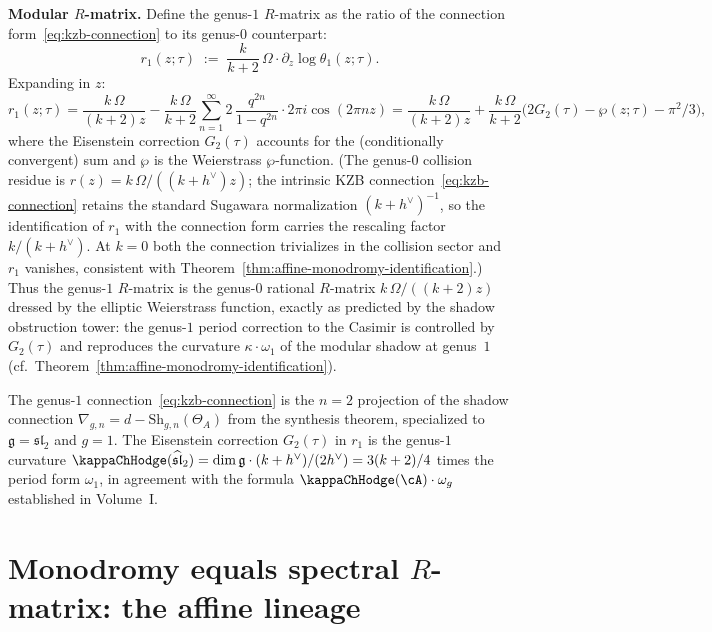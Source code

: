 \begin{computation}
\medskip\noindent\textbf{Modular $R$-matrix.}\;
Define the genus-$1$ $R$-matrix as the ratio of the connection
form~\eqref{eq:kzb-connection} to its genus-$0$ counterpart:
\begin{equation}\label{eq:genus1-r-matrix}
 r_1(z;\tau) \;:=\; \frac{k}{k+2}\,\Omega\cdot \partial_z\!\log\theta_1(z;\tau).
\end{equation}
Expanding in $z$:
\[
 r_1(z;\tau)
 = \frac{k\,\Omega}{(k+2)z}
 - \frac{k\,\Omega}{k+2}\sum_{n=1}^{\infty}2\,
 \frac{q^{2n}}{1-q^{2n}}\cdot 2\pi i\cos(2\pi nz)
 = \frac{k\,\Omega}{(k+2)z}
 + \frac{k\,\Omega}{k+2}\bigl(2G_2(\tau)-\wp(z;\tau)-\pi^2/3\bigr),
\]
where the Eisenstein correction $G_2(\tau)$ accounts for the
(conditionally convergent) sum and $\wp$ is the Weierstrass
$\wp$-function. (The genus-$0$ collision residue is $r(z) = k\,\Omega/((k+h^\vee)z)$; the intrinsic
KZB connection~\eqref{eq:kzb-connection} retains the standard
Sugawara normalization $(k+h^\vee)^{-1}$, so the identification of
$r_1$ with the connection form carries the rescaling factor
$k/(k+h^\vee)$. At $k=0$ both the connection trivializes in the
collision sector and $r_1$ vanishes, consistent with
Theorem~\ref{thm:affine-monodromy-identification}.) Thus the
genus-$1$ $R$-matrix is the genus-$0$
rational $R$-matrix $k\,\Omega/((k+2)z)$ dressed by the elliptic
Weierstrass function, exactly as predicted by the shadow obstruction tower:
the genus-$1$ period correction to the Casimir is controlled by
$G_2(\tau)$ and reproduces the curvature $\kappa\cdot\omega_1$
of the modular shadow at genus~$1$
(cf.\ Theorem~\ref{thm:affine-monodromy-identification}).
\end{computation}

\begin{remark}
\label{rem:kzb-shadow-consistency}
The genus-$1$ connection~\eqref{eq:kzb-connection} is the $n=2$ projection
of the shadow connection $\nabla_{g,n}=d-\mathrm{Sh}_{g,n}(\Theta_A)$
from the synthesis theorem, specialized to $\mathfrak{g}=\mathfrak{sl}_2$
and $g=1$. The Eisenstein correction $G_2(\tau)$ in $r_1$
is the genus-$1$ curvature $\kappaChHodge(\widehat{\mathfrak{sl}}_2)
=\dim\mathfrak{g}\cdot(k+h^\vee)/(2h^\vee)=3(k+2)/4$
times the period form $\omega_1$, in agreement with the formula
$\kappaChHodge(\cA)\cdot\omega_g$ established in Volume~I.
\end{remark}

\section{Monodromy equals spectral $R$-matrix: the affine lineage}\label{sec:affine-monodromy-identification}

